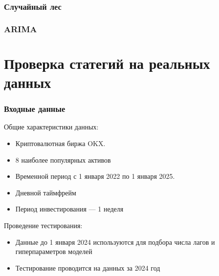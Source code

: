 \documentclass{beamer}
\begin{document}
\begin{frame}
    \frametitle{Случайный лес}

    
\end{frame}

\begin{frame}
    \frametitle{ARIMA}
    
\end{frame}

\section{Проверка статегий на реальных данных}

\begin{frame}
    \frametitle{Входные данные}
    Общие характеристики данных:
    \begin{itemize}
        \item Криптовалютная биржа OKX. 
        \item 8 наиболее популярных активов
        \item Временной период с 1 января 2022 по 1 января 2025.
        \item Дневной таймфрейм
        \item Период инвестирования --- 1 неделя
    \end{itemize}

    Проведение тестирования:
    \begin{itemize}
        \item Данные до 1 января 2024 используются для подбора числа лагов и 
        гиперпараметров моделей
        \item Тестирование проводится на данных за 2024 год
    \end{itemize}
\end{frame}
\end{document}
